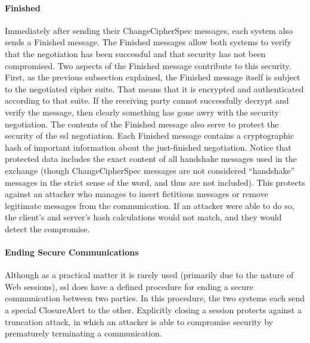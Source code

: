 \paragraph{Finished}
Immediately after sending their ChangeCipherSpec messages, each
system also sends a Finished message. The Finished messages allow
both systems to verify that the negotiation has been successful and
that security has not been compromised. Two aspects of the Finished
message contribute to this security. First, as the previous subsection
explained, the Finished message itself is subject to the negotiated cipher suite. 
That means that it is encrypted and authenticated according to that suite.
 If the receiving party cannot successfully decrypt
and verify the message, then clearly something has gone awry with
the security negotiation.
The contents of the Finished message also serve to protect the security of the
 ssl negotiation. Each Finished message contains a cryptographic hash of 
 important information about the just-finished
negotiation.  Notice that protected data includes the exact content of all
handshake messages used in the exchange (though ChangeCipherSpec messages 
are not considered “handshake” messages in the strict
sense of the word, and thus are not included). This protects against
an attacker who manages to insert fictitious messages or remove 
legitimate messages from the communication. If an attacker were able
to do so, the client’s and server’s hash calculations would not match,
and they would detect the compromise.

\paragraph{Ending Secure Communications}

Although as a practical matter it is rarely used (primarily due to the
nature of Web sessions), ssl does have a defined procedure for ending a
 secure communication between two parties. In this procedure,
 the two systems each send a special ClosureAlert to the other.
Explicitly closing a session protects against a truncation attack, in
which an attacker is able to compromise security by prematurely terminating
 a communication. 

